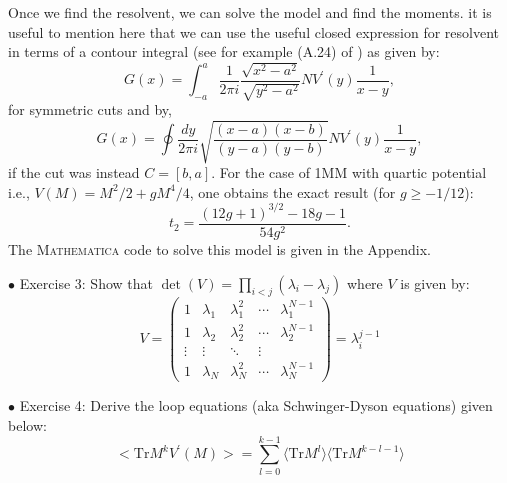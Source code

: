 \documentclass[11pt]{article}
\newcommand{\MA}{\textsc{Mathematica }}
\begin{document}
Once we find the resolvent, we can solve the model and find the moments. it is useful to mention here that we can use the useful closed expression for resolvent in terms of a contour integral (see for example (A.24) of \cite{Migdal:1983qrz})
as given by:
\begin{equation}
	G(x) = \int_{-a}^{a} \frac{1}{2\pi i} \frac{\sqrt{x^2-a^2}}{\sqrt{y^2-a^2}} N V^{\prime}(y) \frac{1}{x-y}, 
\end{equation}
for symmetric cuts and by,
\begin{equation}
	G(x) = \oint \frac{dy}{2\pi i} \sqrt{\frac{(x-a) (x-b)}{(y-a)(y-b)}}  N V^{\prime}(y) \frac{1}{x-y}, 
\end{equation}
if the cut was instead $ C= [b,a]$. For the case of 1MM with quartic potential i.e., $V(M) = M^2/2 + gM^4/4$, one obtains the exact result (for $g \ge -1/12$):
\begin{equation}
\label{eq:exact1MM} 
t_{2} = \frac{(12 g+1)^{3/2}-18 g-1}{54 g^2}. 
\end{equation}
The \MA  code to solve this model is given in the Appendix. 


\begin{mdframed}[backgroundcolor=blue!3] 
	\textsc{} 
	$\bullet$ Exercise 3: Show that $\det(V) = \prod_{i<j} (\lambda_i - \lambda_j)$ where $V$ is given by: 
	\begin{equation*}
		V = 
		\begin{pmatrix}
			1 & \lambda_1 & \lambda_{1}^{2} & \cdots & \lambda_{1}^{N-1} \\
			1 & \lambda_2 & \lambda_{2}^{2} & \cdots & \lambda_{2}^{N-1} \\ 
			\vdots  & \vdots  & \ddots & \vdots  \\
			1 & \lambda_N & \lambda_{N}^{2} & \cdots & \lambda_{N}^{N-1} 
		\end{pmatrix} = \lambda_{i}^{j-1} 
	\end{equation*}
	
\end{mdframed} 

\begin{mdframed}[backgroundcolor=blue!3] 
	\textsc{} 
	$\bullet$ Exercise 4: Derive the loop equations (aka Schwinger-Dyson equations) given below: \\ 
	\begin{equation}
		\label{eq:LE} 
		\Big< \mbox{Tr} M^{k} V^{\prime}(M) \Big> = \sum_{l=0}^{k-1} \langle \mbox{Tr} M^{l} \rangle  \langle \mbox{Tr} M^{k-l-1} \rangle
		\nonumber
	\end{equation} 
\end{mdframed} 
\end{document}
